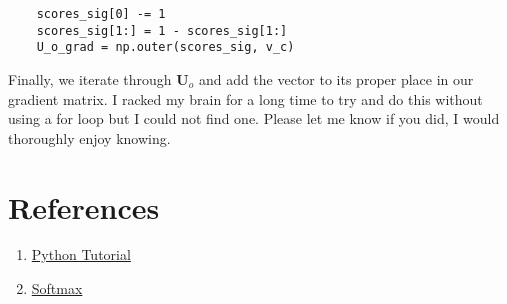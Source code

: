 \documentclass[12pt]{article}
\begin{document}
\begin{verbatim}
    scores_sig[0] -= 1
    scores_sig[1:] = 1 - scores_sig[1:]
    U_o_grad = np.outer(scores_sig, v_c)
\end{verbatim}
Finally, we iterate through $\bm U_o$ and add the vector to its proper place in our 
gradient matrix. I racked my brain for a long time to try and do this without using 
a for loop but I could not find one. Please let me know if you did, I would thoroughly 
enjoy knowing. 


\section{References}
\begin{enumerate}
    \item \href{https://cs231n.github.io/python-numpy-tutorial/}{Python Tutorial}
    \item \href{https://cs231n.github.io/linear-classify/#softmax-classifier}{Softmax}
\end{enumerate}
\end{document}
